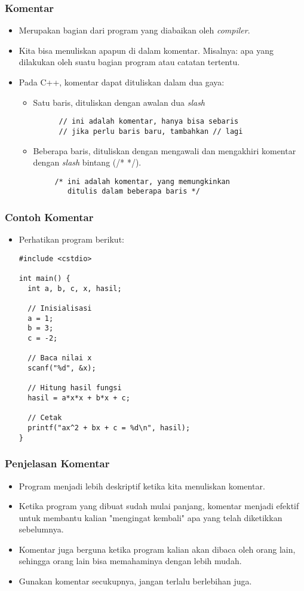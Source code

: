 \begin{frame}[fragile]
\frametitle{Komentar}
\begin{itemize}
  \item Merupakan bagian dari program yang diabaikan oleh \textit{compiler}.
  \item Kita bisa menuliskan apapun di dalam komentar. Misalnya: apa yang dilakukan oleh suatu bagian program atau catatan tertentu.
  \item Pada C++, komentar dapat dituliskan dalam dua gaya:
  \begin{itemize}
    \item Satu baris, dituliskan dengan awalan dua \textit{slash}
    \begin{lstlisting}
      // ini adalah komentar, hanya bisa sebaris
      // jika perlu baris baru, tambahkan // lagi
    \end{lstlisting}
    \item Beberapa baris, dituliskan dengan mengawali dan mengakhiri komentar dengan \textit{slash} bintang (/* */).
    \begin{lstlisting}
     /* ini adalah komentar, yang memungkinkan
        ditulis dalam beberapa baris */
    \end{lstlisting}
  \end{itemize}
\end{itemize}
\end{frame}

\begin{frame} [fragile]
\frametitle{Contoh Komentar}
\begin{itemize}
  \item Perhatikan program berikut:
\begin{lstlisting}
#include <cstdio>

int main() {
  int a, b, c, x, hasil;

  // Inisialisasi
  a = 1;
  b = 3;
  c = -2;

  // Baca nilai x
  scanf("%d", &x);

  // Hitung hasil fungsi
  hasil = a*x*x + b*x + c;

  // Cetak
  printf("ax^2 + bx + c = %d\n", hasil);
}
\end{lstlisting}
\end{itemize}
\end{frame}

\begin{frame}
\frametitle{Penjelasan Komentar}
\begin{itemize}
  \item Program menjadi lebih deskriptif ketika kita menuliskan komentar.
  \item Ketika program yang dibuat sudah mulai panjang, komentar menjadi efektif untuk membantu kalian "mengingat kembali" apa yang telah diketikkan sebelumnya.
  \item Komentar juga berguna ketika program kalian akan dibaca oleh orang lain, sehingga orang lain bisa memahaminya dengan lebih mudah.
  \item Gunakan komentar secukupnya, jangan terlalu berlebihan juga.
\end{itemize}
\end{frame}

